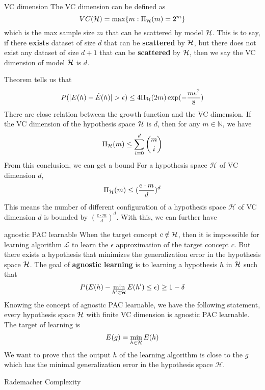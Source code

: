 \documentclass{beamer}
\newcommand{\x}{\mathbf{x}}
\begin{document}
\begin{frame}[allowframebreaks]{VC dimension}
The VC dimension can be defined as
$$VC(\mathcal{H}) = \max \{ m: \Pi_{\mathcal{H}}(m) = 2^m\}$$
which is the max sample size $m$ that can be scattered by model $\mathcal{H}$. This is to say, if there \textbf{exists} dataset of size $d$ that can be \textbf{scattered} by $\mathcal{H}$, but there does not exist any dataset of size $d+1$ that can be \textbf{scattered} by $\mathcal{H}$, then we say the VC dimension of model $\mathcal{H}$ is $d$.

Theorem tells us that
$$P(| E(h) - \hat{E}(h) | > \epsilon ) \le 4 \Pi_{\mathcal{H}}(2m) \exp(- \frac{m\epsilon^2}{8})$$
There are close relation between the growth function and the VC dimension. If the VC dimension of the hypothesis space $\mathcal{H}$ is $d$, then for any $m \in \mathbb{N}$, we have
$$\Pi_{\mathcal{H}} (m) \le \sum_{i=0}^d \binom{m}{i}$$
From this conclusion, we can get a bound
For a hypothesis space $\mathcal{H}$ of VC dimension $d$,
$$\Pi_{\mathcal{H}} (m) \le (\frac{e \cdot m}{d})^d$$
This means the number of different configuration of a hypothesis space $\mathcal{H}$ of VC dimension $d$ is bounded by $(\frac{e \cdot m}{d})^d$. With this, we can further have 

\end{frame}

\begin{frame}{agnostic PAC learnable}
When the target concept $c \notin \mathcal{H}$, then it is imposssible for learning algorithm $\mathcal{L}$ to learn the $\epsilon$ approximation of the target concept $c$. But there exists a hypothesis that minimizes the generalization error in the hypothesis space $\mathcal{H}$. The goal of \textbf{agnostic learning} is to learning a hypothesis $h$ in $\mathcal{H}$ such that 
$$P(E(h) - \min_{h' \in \mathcal{H}} E(h') \le \epsilon) \ge 1 - \delta$$
Knowing the concept of agnostic PAC learnable, we have the following statement, every hypothesis space $\mathcal{H}$ with finite VC dimension is agnostic PAC learnable.
The target of learning is 
$$E(g) = \min_{h \in \mathcal{H}} E(h)$$
We want to prove that the output $h$ of the learning algorithm is close to the $g$ which has the minimal generalization error in the hypothesis space $\mathcal{H}$.
\end{frame}

\begin{frame}{Rademacher Complexity}


\end{frame}
\end{document}
